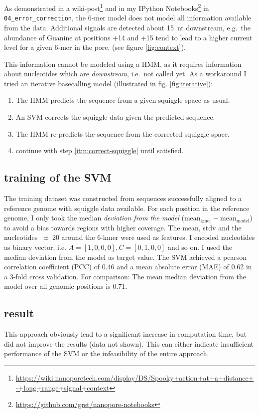 \documentclass[]{scrartcl}
\begin{document}
As demonstrated in a wiki-post\footnote{\url{https://wiki.nanoporetech.com/display/DS/Spooky+action+at+a+distance+-+long+range+signal+context}} and in my IPython Notebooks\footnote{\url{https://github.com/grst/nanopore-notebooks}} in \texttt{04\_error\_correction}, the 6-mer model does not model all information available from the data. Additional signals are detected about \SI{15}{nt} downstream, e.g.\ the abundance of Guanine at positions +14 and +15 tend to lead to a higher current level for a given 6-mer in the pore. (see figure \ref{fig:context}).

This information cannot be modeled using a HMM, as it requires information about nucleotides which are \textit{downstream}, i.e.\ not called yet. As a workaround I tried an iterative basecalling model (illustrated in fig. \ref{fig:iterative}): 

\begin{enumerate}
\item The HMM predicts the sequence from a given squiggle space as usual.
\item An SVM corrects the squiggle data given the predicted sequence. \label{itm:correct-squiggle}
\item The HMM re-predicts the sequence from the corrected squiggle space. 
\item continue with step \ref{itm:correct-squiggle} until satisfied. 
\end{enumerate}

\subsection{training of the SVM}
The training dataset was constructed from sequences successfully aligned to a reference genome with squiggle data available. For each position in the reference genome, I only took the median \textit{deviation from the model} ($\mathrm{mean}_\mathrm{kmer} - \mathrm{mean}_\mathrm{model}$) to avoid a bias towards regions with higher coverage. The mean, stdv and the nucleotides \num{+-20} around the 6-kmer were used as features. I encoded nucleotides as binary vector, i.e. $A=[1, 0, 0, 0], C=[0, 1, 0, 0]$ and so on. I used the median deviation from the model as target value. The SVM achieved a pearson correlation coefficient (PCC) of 0.46 and a mean absolute error (MAE) of 0.62 in a 3-fold cross validation. For comparison: The mean median deviation from the model over all genomic positions is 0.71. 

\subsection{result}
This approach obviously lead to a significant increase in computation time, but did not improve the results (data not shown). This can either indicate insufficient performance of the SVM or the infeasibility of the entire approach. 
\end{document}
